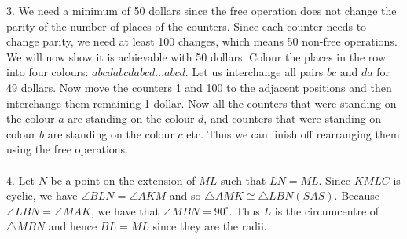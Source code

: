 \documentclass{article}
\begin{document}
3. We need a minimum of 50 dollars since the free operation does not change the parity of the number of places of the counters. Since each counter needs to change parity, we need at least 100 changes, which means 50 non-free operations. We will now show it is achievable with 50 dollars. Colour the places in the row into four colours: $abcdabcdabcd\ldots abcd$. Let us interchange all pairs $bc$ and $da$ for 49 dollars. Now move the counters 1 and 100 to the adjacent positions and then interchange them remaining 1 dollar. Now all the counters that were standing on the colour $a$ are standing on the colour $d$, and counters that were standing on colour $b$ are standing on the colour $c$ etc. Thus we can finish off rearranging them using the free operations.  \\\\
4. Let $N$ be a point on the extension of $ML$ such that $LN=ML$. Since $KMLC$ is cyclic, we have $\angle BLN = \angle AKM$ and so $\triangle AMK \cong \triangle LBN (SAS)$. Because $\angle LBN = \angle MAK$, we have that $\angle MBN = 90^{\circ}$. Thus $L$ is the circumcentre of $\triangle MBN$ and hence $BL = ML$ since they are the radii. \\\\
\end{document}
